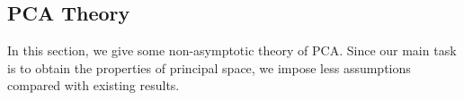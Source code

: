 \subsection{PCA Theory}

In this section, we give some non-asymptotic theory of PCA.
Since our main task is to obtain the properties of principal space,
we impose less assumptions compared with existing results.





